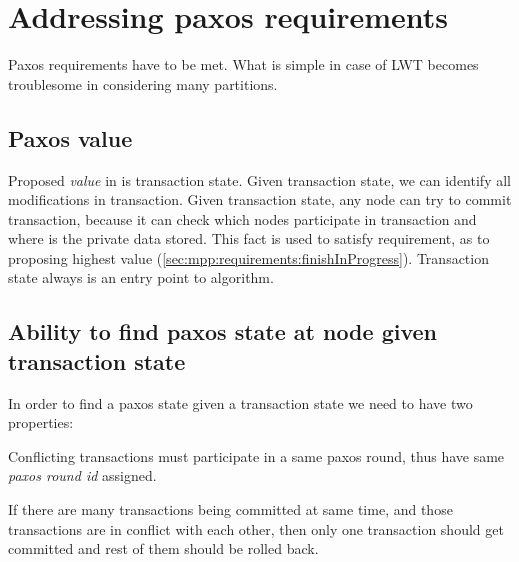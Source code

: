 
\section{Addressing paxos requirements}
Paxos requirements have to be met.
 What is simple in case of LWT becomes troublesome in \mpp considering many partitions. 


\subsection{Paxos value}
Proposed \emph{value} in \mpp is transaction state. Given transaction state, we can identify all modifications in transaction. Given transaction state, any node can try to commit transaction, because it can check which nodes participate in transaction and where is the private data stored. This fact is used to satisfy requirement, as to proposing highest value (\ref{sec:mpp:requirements:finishInProgress}).
Transaction state always is an entry point to algorithm.


\subsection{Ability to find paxos state at node given transaction state}
In order to find a paxos state given a transaction state we need to have two properties:

\begin{definition}
  \label{def:samePaxosStateProperty}
  Conflicting transactions must participate in a same paxos round, thus have same \emph{paxos round id} assigned.  
\end{definition}

\begin{definition}
  \label{def:txSerializability}
  If there are many transactions being committed at same time, and those transactions are in conflict with each other, then only one transaction should get committed and rest of them should be rolled back.   
\end{definition}

